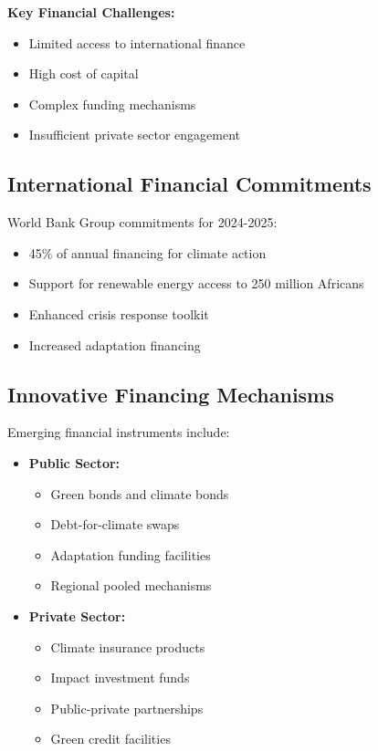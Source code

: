 \begin{keymessage}
\textbf{Key Financial Challenges:}
\begin{itemize}
    \item Limited access to international finance
    \item High cost of capital
    \item Complex funding mechanisms
    \item Insufficient private sector engagement
\end{itemize}
\end{keymessage}

\subsection{International Financial Commitments}
World Bank Group commitments for 2024-2025:

\begin{itemize}
    \item 45\% of annual financing for climate action
    \item Support for renewable energy access to 250 million Africans
    \item Enhanced crisis response toolkit
    \item Increased adaptation financing
\end{itemize}

\subsection{Innovative Financing Mechanisms}
Emerging financial instruments include:

\begin{itemize}
    \item \textbf{Public Sector:}
    \begin{itemize}
        \item Green bonds and climate bonds
        \item Debt-for-climate swaps
        \item Adaptation funding facilities
        \item Regional pooled mechanisms
    \end{itemize}
    
    \item \textbf{Private Sector:}
    \begin{itemize}
        \item Climate insurance products
        \item Impact investment funds
        \item Public-private partnerships
        \item Green credit facilities
    \end{itemize}
\end{itemize}

